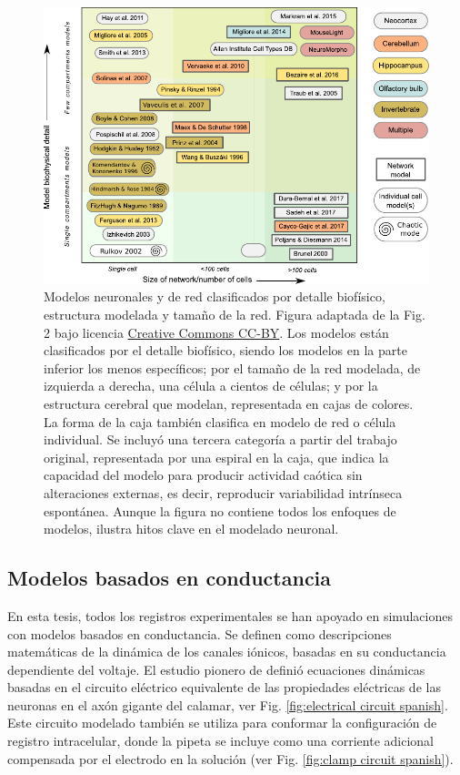 \begin{figure}[bth!]
\centering
\includegraphics[width=\textwidth]{img/intro/models classification_v2.pdf}
\caption{Modelos neuronales y de red clasificados por detalle biofísico, estructura modelada y tamaño de la red. Figura adaptada de la Fig. 2 \cite{gleeson_open_2019} bajo licencia \href{http://creativecommons.org/licenses/by/4.0/}{Creative Commons CC-BY}. Los modelos están clasificados por el detalle biofísico, siendo los modelos en la parte inferior los menos específicos; por el tamaño de la red modelada, de izquierda a derecha, una célula a cientos de células; y por la estructura cerebral que modelan, representada en cajas de colores. La forma de la caja también clasifica en modelo de red o célula individual. Se incluyó una tercera categoría a partir del trabajo original, representada por una espiral en la caja, que indica la capacidad del modelo para producir actividad caótica sin alteraciones externas, es decir, reproducir variabilidad intrínseca espontánea. Aunque la figura no contiene todos los enfoques de modelos, ilustra hitos clave en el modelado neuronal.}
\label{fig:models-classification spanish}
\end{figure}

\subsection{Modelos basados en conductancia}

En esta tesis, todos los registros experimentales se han apoyado en simulaciones con modelos basados en conductancia. Se definen como descripciones matemáticas de la dinámica de los canales iónicos, basadas en su conductancia dependiente del voltaje. El estudio pionero de \cite{hodgkin_quantitative_1952} definió ecuaciones dinámicas basadas en el circuito eléctrico equivalente de las propiedades eléctricas de las neuronas en el axón gigante del calamar, ver Fig. \ref{fig:electrical circuit spanish}. Este circuito modelado también se utiliza para conformar la configuración de registro intracelular, donde la pipeta se incluye como una corriente adicional compensada por el electrodo en la solución (ver Fig. \ref{fig:clamp circuit spanish}).

